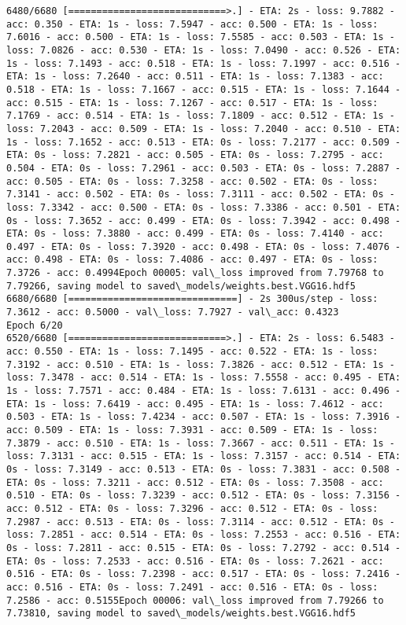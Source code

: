 \documentclass[11pt]{article}
\begin{document}
\begin{Verbatim}[commandchars=\\\{\}]
6480/6680 [============================>.] - ETA: 2s - loss: 9.7882 - acc: 0.350 - ETA: 1s - loss: 7.5947 - acc: 0.500 - ETA: 1s - loss: 7.6016 - acc: 0.500 - ETA: 1s - loss: 7.5585 - acc: 0.503 - ETA: 1s - loss: 7.0826 - acc: 0.530 - ETA: 1s - loss: 7.0490 - acc: 0.526 - ETA: 1s - loss: 7.1493 - acc: 0.518 - ETA: 1s - loss: 7.1997 - acc: 0.516 - ETA: 1s - loss: 7.2640 - acc: 0.511 - ETA: 1s - loss: 7.1383 - acc: 0.518 - ETA: 1s - loss: 7.1667 - acc: 0.515 - ETA: 1s - loss: 7.1644 - acc: 0.515 - ETA: 1s - loss: 7.1267 - acc: 0.517 - ETA: 1s - loss: 7.1769 - acc: 0.514 - ETA: 1s - loss: 7.1809 - acc: 0.512 - ETA: 1s - loss: 7.2043 - acc: 0.509 - ETA: 1s - loss: 7.2040 - acc: 0.510 - ETA: 1s - loss: 7.1652 - acc: 0.513 - ETA: 0s - loss: 7.2177 - acc: 0.509 - ETA: 0s - loss: 7.2821 - acc: 0.505 - ETA: 0s - loss: 7.2795 - acc: 0.504 - ETA: 0s - loss: 7.2961 - acc: 0.503 - ETA: 0s - loss: 7.2887 - acc: 0.505 - ETA: 0s - loss: 7.3258 - acc: 0.502 - ETA: 0s - loss: 7.3141 - acc: 0.502 - ETA: 0s - loss: 7.3111 - acc: 0.502 - ETA: 0s - loss: 7.3342 - acc: 0.500 - ETA: 0s - loss: 7.3386 - acc: 0.501 - ETA: 0s - loss: 7.3652 - acc: 0.499 - ETA: 0s - loss: 7.3942 - acc: 0.498 - ETA: 0s - loss: 7.3880 - acc: 0.499 - ETA: 0s - loss: 7.4140 - acc: 0.497 - ETA: 0s - loss: 7.3920 - acc: 0.498 - ETA: 0s - loss: 7.4076 - acc: 0.498 - ETA: 0s - loss: 7.4086 - acc: 0.497 - ETA: 0s - loss: 7.3726 - acc: 0.4994Epoch 00005: val\_loss improved from 7.79768 to 7.79266, saving model to saved\_models/weights.best.VGG16.hdf5
6680/6680 [==============================] - 2s 300us/step - loss: 7.3612 - acc: 0.5000 - val\_loss: 7.7927 - val\_acc: 0.4323
Epoch 6/20
6520/6680 [============================>.] - ETA: 2s - loss: 6.5483 - acc: 0.550 - ETA: 1s - loss: 7.1495 - acc: 0.522 - ETA: 1s - loss: 7.3192 - acc: 0.510 - ETA: 1s - loss: 7.3826 - acc: 0.512 - ETA: 1s - loss: 7.3478 - acc: 0.514 - ETA: 1s - loss: 7.5558 - acc: 0.495 - ETA: 1s - loss: 7.7571 - acc: 0.484 - ETA: 1s - loss: 7.6131 - acc: 0.496 - ETA: 1s - loss: 7.6419 - acc: 0.495 - ETA: 1s - loss: 7.4612 - acc: 0.503 - ETA: 1s - loss: 7.4234 - acc: 0.507 - ETA: 1s - loss: 7.3916 - acc: 0.509 - ETA: 1s - loss: 7.3931 - acc: 0.509 - ETA: 1s - loss: 7.3879 - acc: 0.510 - ETA: 1s - loss: 7.3667 - acc: 0.511 - ETA: 1s - loss: 7.3131 - acc: 0.515 - ETA: 1s - loss: 7.3157 - acc: 0.514 - ETA: 0s - loss: 7.3149 - acc: 0.513 - ETA: 0s - loss: 7.3831 - acc: 0.508 - ETA: 0s - loss: 7.3211 - acc: 0.512 - ETA: 0s - loss: 7.3508 - acc: 0.510 - ETA: 0s - loss: 7.3239 - acc: 0.512 - ETA: 0s - loss: 7.3156 - acc: 0.512 - ETA: 0s - loss: 7.3296 - acc: 0.512 - ETA: 0s - loss: 7.2987 - acc: 0.513 - ETA: 0s - loss: 7.3114 - acc: 0.512 - ETA: 0s - loss: 7.2851 - acc: 0.514 - ETA: 0s - loss: 7.2553 - acc: 0.516 - ETA: 0s - loss: 7.2811 - acc: 0.515 - ETA: 0s - loss: 7.2792 - acc: 0.514 - ETA: 0s - loss: 7.2533 - acc: 0.516 - ETA: 0s - loss: 7.2621 - acc: 0.516 - ETA: 0s - loss: 7.2398 - acc: 0.517 - ETA: 0s - loss: 7.2416 - acc: 0.516 - ETA: 0s - loss: 7.2491 - acc: 0.516 - ETA: 0s - loss: 7.2586 - acc: 0.5155Epoch 00006: val\_loss improved from 7.79266 to 7.73810, saving model to saved\_models/weights.best.VGG16.hdf5

\end{Verbatim}
\end{document}
